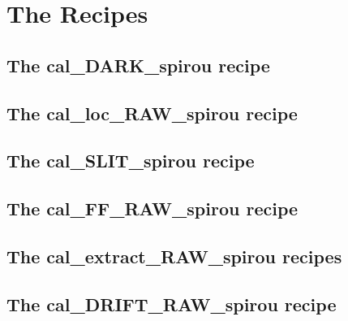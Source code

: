 \chapter{The Recipes}
\label{ch:the_recipes}


\section{The cal\_DARK\_spirou recipe}
\label{ch:the_recipes:cal_DARK_spirou}


\section{The cal\_loc\_RAW\_spirou recipe}
\label{ch:the_recipes:cal_loc_RAW_spirou}


\section{The cal\_SLIT\_spirou recipe}
\label{ch:the_recipes:cal_SLIT_spirou}


\section{The cal\_FF\_RAW\_spirou recipe}
\label{ch:the_recipes:cal_FF_RAW_spirou}


\section{The cal\_extract\_RAW\_spirou recipes}
\label{ch:the_recipes:cal_extract_RAW_spirou}


\section{The cal\_DRIFT\_RAW\_spirou recipe}
\label{ch:the_recipes:cal_DRIFT_RAW_spirou}


